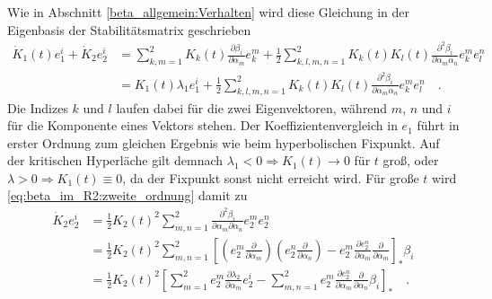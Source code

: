     Wie in Abschnitt \ref{beta_allgemein:Verhalten} wird diese Gleichung in 
    der Eigenbasis der Stabilitätsmatrix geschrieben
    \begin{align}
     \dot{K}_1 (t) e_1^i +\dot{K}_2 e_2^i &= \sum\limits_{k,m=1}^2
     K_k(t) \frac{\partial \beta _i}{\partial \alpha_m} e_k^m 
     + \frac12 \sum\limits_{k,l,m,n=1}^2
     K_k(t)K_l(t)\frac{\partial^2 \beta _i}{\partial \alpha_m \alpha_n}e_k^m  
     e_l^n \\
     &= K_1(t)\lambda_1 e_1^i  + \frac12 \sum\limits_{k,l,m,n=1}^2
     K_k(t)K_l(t)\frac{\partial^2 \beta _i}{\partial \alpha_m \alpha_n}e_k^m  
     e_l^n 
     \quad . \label{eq:beta_im_R2:zweite_ordnung}
    \end{align}
    Die Indizes $k$ und $l$ laufen dabei für die zwei Eigenvektoren, während 
    $m$, $n$ und $i$ für die Komponente eines Vektors stehen. Der 
    Koeffizientenvergleich in $e_1$ führt in erster Ordnung zum gleichen 
    Ergebnis wie beim hyperbolischen Fixpunkt. Auf der kritischen Hyperläche 
    gilt demnach $\lambda_1<0 \Rightarrow K_1(t)\rightarrow 0$ für $t$ groß, 
    oder $\lambda>0 \Rightarrow K_1(t)\equiv 0$, da der Fixpunkt sonst nicht 
    erreicht wird. Für große $t$ wird \eqref{eq:beta_im_R2:zweite_ordnung} 
    damit zu 
    \begin{align}
     \dot{K}_2 e_2^i &= \frac{1}{2} K_2(t)^2 \sum\limits_{m,n=1}^2 
     \frac{\partial^2 \beta_i}{\partial \alpha_m \partial \alpha_n} e_2^m e_2^n
     \\&= \frac12 K_2(t)^2 \sum\limits_{m,n=1}^2 \left[ \left(e_2^m 
     \frac{\partial}{\partial \alpha_m} \right) 
     \left(e_2^n \frac{\partial}{\partial \alpha_n} \right) - e_2^m 
     \frac{\partial e_2^n}{\partial \alpha_m} \frac{\partial}{\partial \alpha_m}
     \right]_* \beta_i \\
     &= \frac12 K_2(t)^2 \left[ \sum\limits_{m=1}^2 e_2^m 
     \frac{\partial\lambda_2}{\partial \alpha_m}e_2^i - \sum\limits_{m,n=1}^2 
     e_2^m \frac{\partial e_2^n}{\partial \alpha_m} 
     \frac{\partial}{\partial \alpha_n} \beta_i \right]_* \quad . 
     \label{eq:beta_im_R2:mischterm}
    \end{align}
